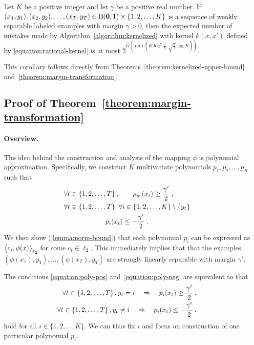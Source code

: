 \begin{corollary}
\label{corollary:weakly-separable-examples-mistake-upper-bound}
Let $K$ be a positive integer and let $\gamma$ be a positive real number. If
$(x_1, y_1), (x_2, y_2), \dots, (x_T, y_T) \in \operatorname{B}(\mathbf{0},1) \times \{1,2,\dots,K\}$
is a sequence of weakly separable labeled examples with margin $\gamma > 0$,
then the expected number of mistakes made by Algorithm~\ref{algorithm:kernelized}
with kernel $k(x,x')$ defined by \eqref{equation:rational-kernel}
is at most $2^{\widetilde{O}(\min(K \log^2 \frac{1}{\gamma},
\sqrt{\frac{1}{\gamma}} \log K))}$.
\end{corollary}

This corollary follows directly from
Theorems~\ref{theorem:kernelized-upper-bound}
and~\ref{theorem:margin-transformation}.

\subsection{Proof of Theorem~\ref{theorem:margin-transformation}}
\label{section:margin-transformation}

\paragraph{Overview.} The idea behind the construction and analysis of the
mapping $\phi$ is polynomial approximation. Specifically, we construct $K$
multivariate polynomials $p_1, p_2, \dots,p_K$ such that
\begin{align}
\label{equation:poly-pos}
& \forall t \in \cbr{1,2,\dots,T}, \qquad p_{y_t}(x_t) \ge \frac{\gamma'}{2} \; ,
\\
\label{equation:poly-neg}
& \begin{gathered}
\forall t \in \cbr{1,2,\dots,T} \ \forall i \in \cbr{1,2,\ldots,K} \setminus \cbr{y_t} \\
p_i(x_t) \le - \frac{\gamma'}{2} \; .
\end{gathered}
\end{align}
We then show (\autoref{lemma:norm-bound}) that each polynomial $p_i$ can be
expressed as $\left\langle c_i, \phi(x) \right\rangle_{\ell_2}$ for some $c_i \in \ell_2$. This
immediately implies that that the examples $(\phi(x_1),y_1), \ldots,
(\phi(x_T),y_T)$ are strongly linearly separable with margin $\gamma'$.

The conditions \eqref{equation:poly-pos} and~\eqref{equation:poly-neg} are
equivalent to that
\begin{align}
\label{equation:poly-pos-i}
\forall t \in \cbr{1,2,\dots,T}, y_t = i \quad \Rightarrow \quad p_i(x_t) \ge \frac{\gamma'}{2} \; , \\
\label{equation:poly-neg-i}
\forall t \in \cbr{1,2,\dots,T}, y_t \neq i \quad \Rightarrow \quad p_i(x_t) \le -\frac{\gamma'}{2} \; .
\end{align}
hold for all $i \in \{1,2,\dots,K\}$. We can thus fix $i$ and focus on
construction of one particular polynomial $p_i$.

